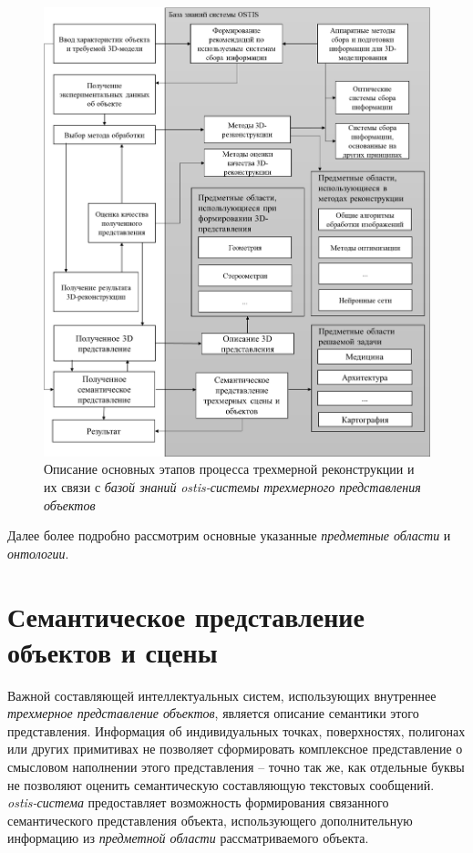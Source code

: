 \begin{figure}[H]
    \includegraphics[scale=0.3]{author/part4/figures/schema3D.png}
    \caption{Описание основных этапов процесса трехмерной реконструкции и их связи с \textit{базой знаний} \textit{ostis-системы} \textit{трехмерного представления объектов}}
    \label{fig:schema-3d-reconstruction}
\end{figure}

Далее более подробно рассмотрим основные указанные \textit{предметные области} и \textit{онтологии}.

\section{Семантическое представление объектов и сцены}
\label{sec_3d_models_semantics}

Важной составляющей интеллектуальных систем, использующих внутреннее \textit{трехмерное представление объектов}, является описание семантики этого представления. Информация об индивидуальных точках, поверхностях, полигонах или других примитивах не позволяет сформировать комплексное представление о смысловом наполнении этого представления -- точно так же, как отдельные буквы не позволяют оценить семантическую составляющую текстовых сообщений. \textit{ostis-система} предоставляет возможность формирования связанного семантического представления объекта, использующего дополнительную информацию из \textit{предметной области} рассматриваемого объекта.

